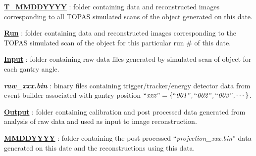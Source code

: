 \documentclass{article}
\begin{document}
\begin{myEnumerate}[labelindent=0pt, leftmargin=*]
\begin{myEnumerate}[labelindent=1pt, leftmargin=*]
\begin{myEnumerate}[labelindent=1pt, leftmargin=*]
\begin{myEnumerate}[labelindent=1pt, leftmargin=*]
\begin{myEnumerate}[labelindent=1pt, leftmargin=*]
\begin{myEnumerate}[labelindent=1pt, leftmargin=*]
\begin{myEnumerate}[labelindent=1pt, leftmargin=*]
\begin{myEnumerate}[labelindent=1pt, leftmargin=*]
\begin{myEnumerate}[labelindent=1pt, leftmargin=*]
\begin{myEnumerate}[labelindent=1pt, leftmargin=*]
                                    \end{myEnumerate}
                                \end{myEnumerate}
                            \end{myEnumerate}
                        \end{myEnumerate}
                    \end{myEnumerate}
                \end{myEnumerate}
            \end{myEnumerate}
            \item \ul{\textbf{T\_MMDDYYYY}} : folder containing data and reconstructed images corresponding to all TOPAS simulated scans of the object generated on this date.
            \begin{myEnumerate}[labelindent=1pt, leftmargin=*]
                \item \ul{\textbf{Run}} : folder containing data and reconstructed images corresponding to the TOPAS simulated scan of the object for this particular run \# of this date.
                \begin{myEnumerate}[labelindent=1pt, leftmargin=*]
                    \item \ul{\textbf{Input}} : folder containing raw data files generated by simulated scan of object for each gantry angle.
                    \begin{myEnumerate}[labelindent=1pt, leftmargin=*]
                        \item \textbf{\textit{raw\_xxx.bin}} : binary files containing trigger/tracker/energy detector data from event builder associated with gantry position $\textrm{``\textit{xxx}''} =\{\textrm{``\textit{001}''}, \textrm{``\textit{002}''}, \textrm{``\textit{003}''}, \cdots\}$.
                    \end{myEnumerate}
                    \item \ul{\textbf{Output}} : folder containing calibration and post processed data generated from analysis of raw data and used as input to image reconstruction.
                    \begin{myEnumerate}[labelindent=1pt, leftmargin=*]
                        \item \ul{\textbf{MMDDYYYY}} : folder containing the post processed ``\textit{projection\_xxx.bin}'' data generated on this date and the reconstructions using this data.
                        \begin{myEnumerate}[labelindent=1pt, leftmargin=*]

\end{myEnumerate}
\end{myEnumerate}
\end{myEnumerate}
\end{myEnumerate}
\end{myEnumerate}
\end{myEnumerate}
\end{myEnumerate}
\end{document}
